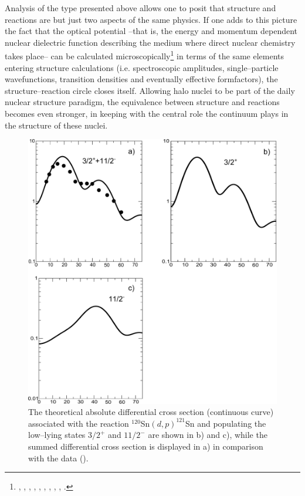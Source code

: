   
  Analysis of the type presented above allows one to posit that structure and reactions are but just two aspects of the same physics. If one adds to this picture the fact that the optical potential --that is, the energy and momentum dependent nuclear dielectric function describing the medium 	where direct nuclear chemistry takes place-- can be calculated microscopically\footnote{\cite{Mahaux:85}, \cite{Fernandez:10}, \cite{Fernandez:10b}, \cite{Broglia:81b}, \cite{Pollarolo:83}, \cite{Broglia:04a}, \cite{Dickhoff:05}, \cite{Jenning:11}, \cite{Montanari:14}, \cite{Rotureau:17}.} in terms of the same elements entering structure calculations (i.e. spectroscopic amplitudes, single--particle wavefunctions, transition densities and eventually effective formfactors), the structure--reaction circle closes itself.
  Allowing  halo nuclei to be part of the daily nuclear structure paradigm, the equivalence between structure and reactions becomes even stronger, in keeping with the central role the continuum plays in the structure of these nuclei.
    \begin{figure}
    \centerline{\includegraphics*[width=\textwidth,angle=0]{C6/figs_C6/fig6_2_2.pdf}}
    \caption{The theoretical absolute differential cross section (continuous curve) associated with the reaction $^{120}$Sn$(d,p)^{121}$Sn and populating the low--lying states $3/2^+$ and $11/2^-$ are shown in b) and c), while the summed differential cross section is displayed in a) in comparison with the data (\cite{Bechara:75}).}\label{fig6.2.2}
    \end{figure}
  
